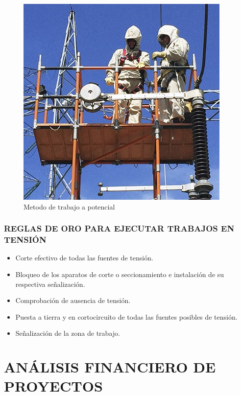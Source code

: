 \documentclass[a5paper]{book}%
\begin{document}
        \begin{figure}[H]
          \centering
          \caption{Metodo de trabajo a potencial}
          \label{fig:trabajoapotencial}
          \includegraphics[width=\linewidth]{trabajo_potencial}
        \end{figure}

\subsection{REGLAS DE ORO PARA EJECUTAR TRABAJOS EN TENSIÓN}

\begin{itemize}
\item Corte efectivo de todas las fuentes de tensión.
\item Bloqueo de los aparatos de corte o seccionamiento e instalación de su respectiva señalización.
\item Comprobación de ausencia de tensión.
\item Puesta a tierra y en cortocircuito de todas las fuentes posibles de tensión.
\item  Señalización de la zona de trabajo.
\end{itemize}

\chapter{ANÁLISIS FINANCIERO DE PROYECTOS}
\end{document}
